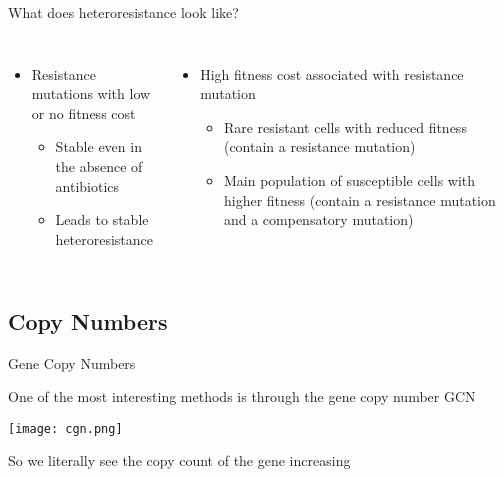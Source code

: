 \documentclass[aspectratio=169,  notheorems, sOuRcEs]{RUCPresentation}
\begin{document}
\begin{frame}

    What does heteroresistance look like?
    \begin{columns}[T]
        \column{0.5\framewidth}

        \begin{itemize}
            \item Resistance mutations with low or no fitness cost
                \begin{itemize}
                    \item Stable even in the absence of antibiotics
                    \item Leads to stable heteroresistance
                \end{itemize}
        \end{itemize}

        \column{0.5\framewidth}

        \begin{itemize}
            \item High fitness cost associated with resistance mutation
                \begin{itemize}
                    \item Rare resistant cells with reduced fitness
                        (contain a resistance mutation)
                    \item Main population of susceptible cells with higher
                        fitness (contain a resistance mutation and a
                        compensatory mutation)
                \end{itemize}
        \end{itemize}

    \end{columns}

\end{frame}

\subsection{Copy Numbers}

\begin{frame}{Gene Copy Numbers}

    \centering

    \vspace{1em}
    One of the most interesting methods is through the
    gene copy number GCN\par
    \texttt{[image: cgn.png]}\par
    So we literally see the copy count of the gene increasing


\end{frame}
\end{document}
